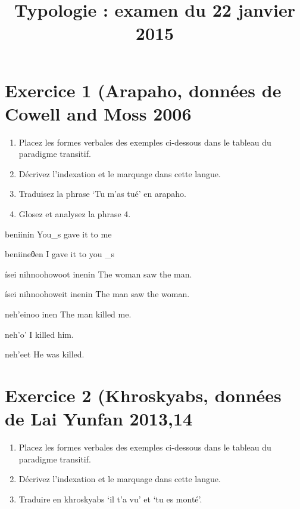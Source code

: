 \documentclass[oldfontcommands,twoside,a4paper,12pt]{article}
\begin{document}
\title{Typologie : examen du 22 janvier 2015}
\date{}
\maketitle
 

\section*{Exercice 1 (Arapaho, données de Cowell and Moss 2006}
\begin{enumerate}
\item Placez les formes verbales des exemples ci-dessous dans le tableau du paradigme transitif.
\item Décrivez l'indexation et le marquage dans cette langue.
\item Traduisez la phrase `Tu m'as tué' en arapaho.
\item Glosez et analysez la phrase 4.
\end{enumerate}

\begin{multicols}{2}
\begin{exe}
\ex 
\glt beniinin
\glt You_s gave it to me
\end{exe} 

\begin{exe}
\ex 
\glt beniineθen
\glt I gave it to you _s
\end{exe} 

 \begin{exe}
\ex 
\glt ísei  nihnoohowoot inenin
\glt The woman saw the man.
\end{exe} 

 \begin{exe}
\ex 
\glt ísei  nihnoohoweit inenin
\glt The man saw the woman.
\end{exe} 

 \begin{exe}
\ex 
\glt neh’einoo inen
\glt The man killed me.
\end{exe} 

 \begin{exe}
\ex 
\glt neh’o'
\glt I killed him.
\end{exe} 

 \begin{exe}
\ex  \label{pass:arapaho}
\glt neh’eet
\glt He was killed.
\end{exe} 

\end{multicols}

\section*{Exercice 2 (Khroskyabs, données de Lai Yunfan 2013,14}
\begin{enumerate}
\item Placez les formes verbales des exemples ci-dessous dans le tableau du paradigme transitif.
\item Décrivez l'indexation et le marquage dans cette langue.
\item Traduire en khroskyabs   `il t'a vu' et `tu es monté'.
\end{enumerate}
\end{document}
